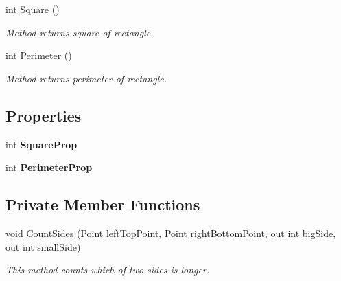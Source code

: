 \begin{DoxyCompactItemize}
int \mbox{\hyperlink{class_home_work_1_1_task_library_1_1_tasks_1_1_lesson1_1_1_classes_1_1_rectangle_aae21928ea4ee074dd66821ad1be775ef}{Square}} ()
\begin{DoxyCompactList}\small\item\em Method returns square of rectangle. \end{DoxyCompactList}\item 
int \mbox{\hyperlink{class_home_work_1_1_task_library_1_1_tasks_1_1_lesson1_1_1_classes_1_1_rectangle_a56ffdebc16fabeb800da11f8a29a274d}{Perimeter}} ()
\begin{DoxyCompactList}\small\item\em Method returns perimeter of rectangle. \end{DoxyCompactList}\end{DoxyCompactItemize}
\subsection*{Properties}
\begin{DoxyCompactItemize}
\item 
\mbox{\label{class_home_work_1_1_task_library_1_1_tasks_1_1_lesson1_1_1_classes_1_1_rectangle_a8a167af60a42eb0222f349b3d96d8ae8}} 
int {\bfseries Square\+Prop}
\item 
\mbox{\label{class_home_work_1_1_task_library_1_1_tasks_1_1_lesson1_1_1_classes_1_1_rectangle_a2b114e2e0f70c0fc32432b74ccfb359d}} 
int {\bfseries Perimeter\+Prop}
\end{DoxyCompactItemize}
\subsection*{Private Member Functions}
\begin{DoxyCompactItemize}
\item 
void \mbox{\hyperlink{class_home_work_1_1_task_library_1_1_tasks_1_1_lesson1_1_1_classes_1_1_rectangle_a1f2710a94a41d7481074506484bf6c65}{Count\+Sides}} (\mbox{\hyperlink{struct_home_work_1_1_task_library_1_1_tasks_1_1_lesson1_1_1_classes_1_1_point}{Point}} left\+Top\+Point, \mbox{\hyperlink{struct_home_work_1_1_task_library_1_1_tasks_1_1_lesson1_1_1_classes_1_1_point}{Point}} right\+Bottom\+Point, out int big\+Side, out int small\+Side)
\begin{DoxyCompactList}\small\item\em This method counts which of two sides is longer. \end{DoxyCompactList}\end{DoxyCompactItemize}
